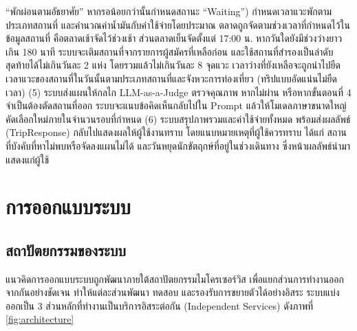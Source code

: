 ``พักผ่อนตามอัธยาศัย'' หากรอน้อยกว่านั้นกำหนดสถานะ ``Waiting'') กำหนดเวลาแวะพักตามประเภทสถานที่ และคำนวณค่าน้ำมันกับค่าใช้จ่ายโดยประมาณ ตลาดถูกจัดตามช่วงเวลาที่กำหนดไว้ในข้อมูลสถานที่ คือตลาดเช้าจัดไว้ช่วงเช้า ส่วนตลาดเย็นจัดตั้งแต่ 17:00 น. หากวันใดยังมีช่วงว่างยาวเกิน 180 นาที ระบบจะเติมสถานที่จากรายการผู้สมัครที่เหลือก่อน และใช้สถานที่สำรองเป็นลำดับสุดท้ายได้ไม่เกินวันละ 2 แห่ง โดยรวมแล้วไม่เกินวันละ 8 จุดแวะ เวลาว่างที่ยังเหลือจะถูกนำไปยืดเวลาแวะของสถานที่ในวันนั้นตามประเภทสถานที่และจังหวะการท่องเที่ยว (ทริปแบบอัดแน่นไม่ยืดเวลา) (5) ระบบส่งแผนให้กลไก LLM-as-a-Judge ตรวจคุณภาพ หากไม่ผ่าน หรือหากขั้นตอนที่ 4 จำเป็นต้องตัดสถานที่ออก ระบบจะแนบข้อคิดเห็นกลับไปใน Prompt แล้วให้โมเดลภาษาขนาดใหญ่ คัดเลือกใหม่ภายในจำนวนรอบที่กำหนด (6) ระบบสรุปภาพรวมและค่าใช้จ่ายทั้งหมด พร้อมส่งผลลัพธ์ (TripResponse) กลับไปแสดงผลให้ผู้ใช้งานทราบ โดยแนบหมายเหตุที่ผู้ใช้ควรทราบ ได้แก่ สถานที่บังคับที่หาไม่พบหรือจัดลงแผนไม่ได้ และวันหยุดนักขัตฤกษ์ที่อยู่ในช่วงเดินทาง ซึ่งหน้าผลลัพธ์นำมาแสดงแก่ผู้ใช้

\section{การออกแบบระบบ}

\subsection{สถาปัตยกรรมของระบบ}

แนวคิดการออกแบบระบบถูกพัฒนาภายใต้สถาปัตยกรรมไมโครเซอร์วิส เพื่อแยกส่วนการทำงานออกจากกันอย่างชัดเจน ทำให้แต่ละส่วนพัฒนา ทดสอบ และรองรับการขยายตัวได้อย่างอิสระ ระบบแบ่งออกเป็น 3 ส่วนหลักที่ทำงานเป็นบริการอิสระต่อกัน (Independent Services) ดังภาพที่ \ref{fig:architecture}

